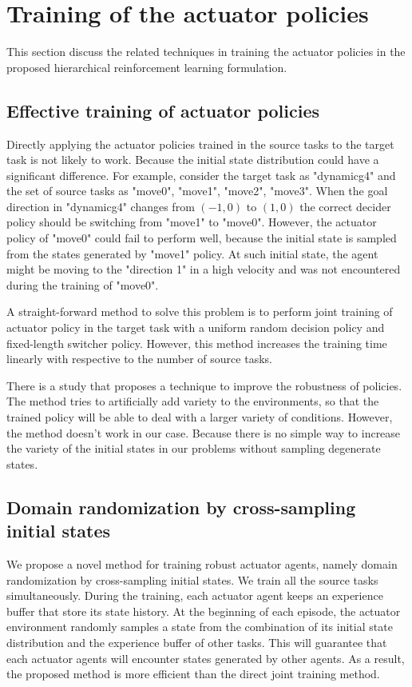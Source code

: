 \section{Training of the actuator policies}
This section discuss the related techniques in training the actuator policies in the proposed hierarchical reinforcement learning formulation.
\subsection{Effective training of actuator policies}
Directly applying the actuator policies trained in the source tasks to the target task is not likely to work. Because the initial state distribution could have a significant difference.
For example, consider the target task as "dynamicg4" and the set of source tasks as "move0", "move1", "move2", "move3". When the goal direction in "dynamicg4" changes from $(-1,0)$ to $(1,0)$ the correct decider policy should be switching from "move1" to "move0". However, the actuator policy of "move0" could fail to perform well, because the initial state is sampled from the states generated by "move1" policy. At such initial state, the agent might be moving to the "direction 1" in a high velocity and was not encountered during the training of "move0".

A straight-forward method to solve this problem is to perform joint training of actuator policy in the target task with a uniform random decision policy and fixed-length switcher policy. However, this method increases the training time linearly with respective to the number of source tasks.

There is a study \cite{tobin2017domain} that proposes a technique to improve the robustness of policies. The method tries to artificially add variety to the environments, so that the trained policy will be able to deal with a larger variety of conditions. However, the method doesn't work in our case. Because there is no simple way to increase the variety of the initial states in our problems without sampling degenerate states. 

\subsection{Domain randomization by cross-sampling initial states}
We propose a novel method for training robust actuator agents, namely domain randomization by cross-sampling initial states. We train all the source tasks simultaneously. During the training, each actuator agent keeps an experience buffer that store its state history. At the beginning of each episode, the actuator environment randomly samples a state from the combination of its initial state distribution and the experience buffer of other tasks. This will guarantee that each actuator agents will encounter states generated by other agents. As a result, the proposed method is more efficient than the direct joint training method.


